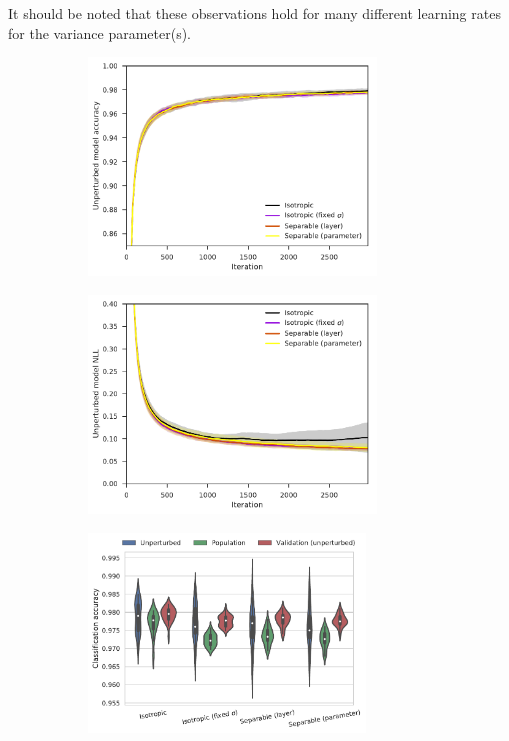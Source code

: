 It should be noted that these observations hold for many different learning rates for the variance parameter(s).

\begin{figure}[tbp!]
    \begin{subfigure}[b]{0.49\textwidth}
        \centering
        \includegraphics[height=5.8cm]{graphics/E029-VO-S5-MD-analysis/accuracy_val-all-series-mean-sd.pdf}
        \caption{}
        \label{fig: Theory: E029-VO-S5-MD-analysis/accuracy_val-all-series-mean-sd}
    \end{subfigure}
    \hfill
    \begin{subfigure}[b]{0.49\textwidth}
        \centering
        \includegraphics[height=5.8cm]{graphics/E029-VO-S5-MD-analysis/return_val-all-series-mean-sd.pdf}
        \caption{}
        \label{fig: Theory: E029-VO-S5-MD-analysis/return_val-all-series-mean-sd}
    \end{subfigure}
    \begin{subfigure}[b]{0.49\textwidth}
        \centering
        \includegraphics[height=5.3cm]{graphics/E029-VO-S5-MD-analysis/accuracy-final-distribution-boxplot-grouped.pdf}

\end{subfigure}
\end{figure}
